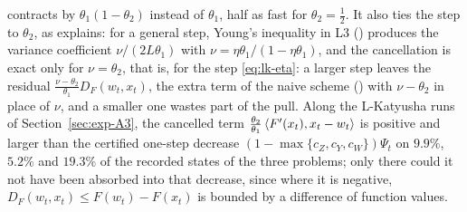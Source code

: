 contracts by $\theta_1(1-\theta_2)$ instead of $\theta_1$, half as fast for $\theta_2=\frac12$. It also ties the step to
$\theta_2$, as  explains: for a general step, Young's inequality in L3 ()
produces the variance coefficient $\nu/(2L\theta_1)$ with $\nu=\eta\theta_1/(1-\eta\theta_1)$, and the cancellation is
exact only for $\nu=\theta_2$, that is, for the step \eqref{eq:lk-eta}: a larger step leaves the residual
$\frac{\nu-\theta_2}{\theta_1}D_F(w_t,x_t)$, the extra term of the naive scheme () with
$\nu-\theta_2$ in place of $\nu$, and a smaller one wastes part of the pull. Along the L-Katyusha runs of
Section~\ref{sec:exp-A3}, the cancelled term $\frac{\theta_2}{\theta_1}\left\langle F'(x_t), x_t-w_t \right\rangle$ is positive and larger
than the certified one-step decrease $(1-\max\{c_Z,c_Y,c_W\})\Psi_t$ on $9.9\%$, $5.2\%$ and $19.3\%$ of the recorded
states of the three problems; only there could it not have been absorbed into that decrease, since where it is
negative, $D_F(w_t,x_t)\le F(w_t)-F(x_t)$ is bounded by a difference of function values.

